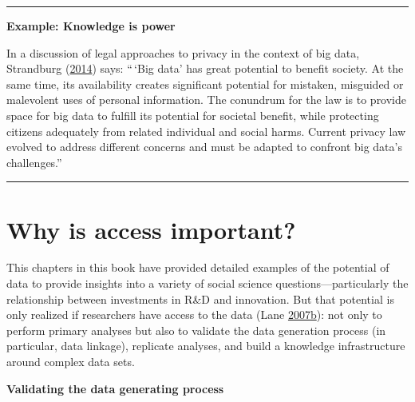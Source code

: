 \documentclass[]{krantz}
\begin{document}
\begin{center}\rule{0.5\linewidth}{\linethickness}\end{center}

\textbf{Example: Knowledge is power}

In a discussion of legal approaches to privacy in the context of big
data, Strandburg (\protect\hyperlink{ref-Strandburg2014}{2014}) says:
``\,`Big data' has great potential to benefit society. At the same time,
its availability creates significant potential for mistaken, misguided
or malevolent uses of personal information. The conundrum for the law is
to provide space for big data to fulfill its potential for societal
benefit, while protecting citizens adequately from related individual
and social harms. Current privacy law evolved to address different
concerns and must be adapted to confront big data's challenges.''

\begin{center}\rule{0.5\linewidth}{\linethickness}\end{center}

\section{Why is access important?}\label{why-is-access-important}

This chapters in this book have provided detailed examples of the
potential of data to provide insights into a variety of social science
questions---particularly the relationship between investments in R\&D
and innovation. But that potential is only realized if researchers have
access to the data (Lane
\protect\hyperlink{ref-Lane2007}{2007}\protect\hyperlink{ref-Lane2007}{b}):
not only to perform primary analyses but also to validate the data
generation process (in particular, data linkage), replicate analyses,
and build a knowledge infrastructure around complex data sets.

\textbf{Validating the data generating process}
\end{document}
